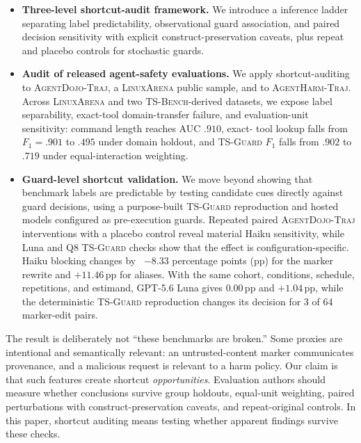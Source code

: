 \documentclass{article}
\newcommand{\tsbench}{\textsc{TS-Bench}}
\newcommand{\tsguard}{\textsc{TS-Guard}}
\newcommand{\agentdojo}{\textsc{AgentDojo-Traj}}
\newcommand{\agentharm}{\textsc{AgentHarm-Traj}}
\newcommand{\linuxarena}{\textsc{LinuxArena}}
\newcommand{\pp}{\,\mathrm{pp}}
\begin{document}
\begin{itemize}[leftmargin=*]
  \item
  \textbf{Three-level shortcut-audit framework.} We introduce a
  inference ladder separating label predictability, observational guard association,
  and paired decision sensitivity with explicit construct-preservation caveats, plus
  repeat and placebo controls for stochastic guards.
  \item
  \textbf{Audit of released agent-safety evaluations.} 
  We apply shortcut-auditing to \agentdojo{}, a \linuxarena{} public sample, and to \agentharm{}. Across \linuxarena{} and two \tsbench{}-derived datasets, we expose label separability, exact-tool domain-transfer failure, and evaluation-unit sensitivity: command length reaches AUC $.910$, exact- tool lookup falls from $F_1=.901$ to $.495$ under domain holdout, and \tsguard{} $F_1$ falls from $.902$ to $.719$ under equal-interaction weighting.
    \item \textbf{Guard-level shortcut validation.}
    We move beyond showing that benchmark labels are predictable by testing candidate
    cues directly against guard decisions, using a purpose-built \tsguard{}
    reproduction and hosted models configured as pre-execution guards. Repeated paired
    \agentdojo{} interventions with a placebo control reveal material Haiku sensitivity,
    while Luna and Q8 \tsguard{} checks show that the effect is configuration-specific. Haiku blocking changes by \ $-8.33$ percentage points (pp) for the marker rewrite and $+11.46\pp$ for aliases.  With the same cohort, conditions, schedule, repetitions, and estimand, GPT-5.6 Luna gives $0.00\pp$ and $+1.04\pp$, while the deterministic \tsguard{} reproduction changes its decision for 3 of 64 marker-edit pairs.
\end{itemize}


The result is deliberately not ``these benchmarks are broken.''  Some proxies are
intentional and semantically relevant: an untrusted-content marker communicates
provenance, and a malicious request is relevant to a harm policy.  Our claim is that
such features create shortcut \emph{opportunities}.  Evaluation authors should
measure whether conclusions survive group holdouts, equal-unit weighting, paired
perturbations with construct-preservation caveats, and repeat-original controls.
In this paper, shortcut auditing means testing whether apparent findings
survive these checks.
\end{document}
